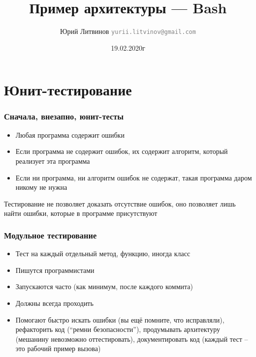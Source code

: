\documentclass[xetex,mathserif,serif]{beamer}
\title{Пример архитектуры --- Bash}
\author[Юрий Литвинов]{Юрий Литвинов \newline \textcolor{gray}{\small\texttt{yurii.litvinov@gmail.com}}}
\date{19.02.2020г}
\begin{document}
	
	\frame{\titlepage}

	\section{Юнит-тестирование}

	\begin{frame}
		\frametitle{Сначала, внезапно, юнит-тесты}
		\begin{itemize}
			\item Любая программа содержит ошибки
			\item Если программа не содержит ошибок, их содержит алгоритм, который реализует эта программа
			\item Если ни программа, ни алгоритм ошибок не содержат, такая программа даром никому не нужна
		\end{itemize}
		Тестирование не позволяет доказать отсутствие ошибок, оно позволяет лишь найти ошибки, которые в программе присутствуют
	\end{frame}

	\begin{frame}
		\frametitle{Модульное тестирование}
		\begin{itemize}
			\item Тест на каждый отдельный метод, функцию, иногда класс
			\item Пишутся программистами
			\item Запускаются часто (как минимум, после каждого коммита)
			\item Должны всегда проходить
			\item Помогают быстро искать ошибки (вы ещё помните, что исправляли), рефакторить код (``ремни безопасности''), продумывать архитектуру (мешанину невозможно оттестировать), документировать код (каждый тест -- это рабочий пример вызова)
		\end{itemize}
	\end{frame}
\end{document}
